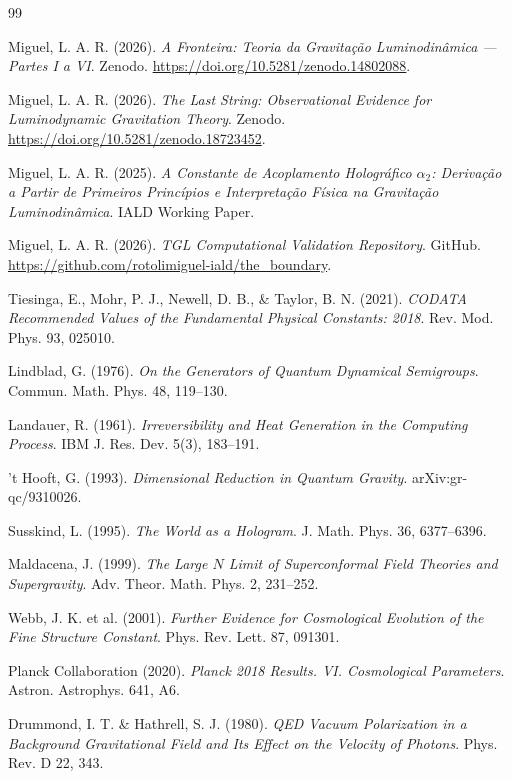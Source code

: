 \documentclass[12pt,a4paper,twoside]{article}
\begin{document}
\begin{thebibliography}{99}

Miguel, L. A. R. (2026).
\textit{A Fronteira: Teoria da Gravitação Luminodinâmica --- Partes I a VI}.
Zenodo. \url{https://doi.org/10.5281/zenodo.14802088}.

Miguel, L. A. R. (2026).
\textit{The Last String: Observational Evidence for Luminodynamic Gravitation Theory}.
Zenodo. \url{https://doi.org/10.5281/zenodo.18723452}.

Miguel, L. A. R. (2025).
\textit{A Constante de Acoplamento Holográfico $\alpha_2$: Derivação a Partir de Primeiros Princípios e Interpretação Física na Gravitação Luminodinâmica}.
IALD Working Paper.

Miguel, L. A. R. (2026).
\textit{TGL Computational Validation Repository}.
GitHub. \url{https://github.com/rotolimiguel-iald/the_boundary}.

Tiesinga, E., Mohr, P. J., Newell, D. B., \& Taylor, B. N. (2021).
\textit{CODATA Recommended Values of the Fundamental Physical Constants: 2018}.
Rev. Mod. Phys. 93, 025010.

Lindblad, G. (1976).
\textit{On the Generators of Quantum Dynamical Semigroups}.
Commun. Math. Phys. 48, 119--130.

Landauer, R. (1961).
\textit{Irreversibility and Heat Generation in the Computing Process}.
IBM J. Res. Dev. 5(3), 183--191.

't Hooft, G. (1993).
\textit{Dimensional Reduction in Quantum Gravity}.
arXiv:gr-qc/9310026.

Susskind, L. (1995).
\textit{The World as a Hologram}.
J. Math. Phys. 36, 6377--6396.

Maldacena, J. (1999).
\textit{The Large $N$ Limit of Superconformal Field Theories and Supergravity}.
Adv. Theor. Math. Phys. 2, 231--252.

Webb, J. K. et al. (2001).
\textit{Further Evidence for Cosmological Evolution of the Fine Structure Constant}.
Phys. Rev. Lett. 87, 091301.

Planck Collaboration (2020).
\textit{Planck 2018 Results. VI. Cosmological Parameters}.
Astron. Astrophys. 641, A6.

Drummond, I. T. \& Hathrell, S. J. (1980).
\textit{QED Vacuum Polarization in a Background Gravitational Field and Its Effect on the Velocity of Photons}.
Phys. Rev. D 22, 343.


\end{thebibliography}
\end{document}

